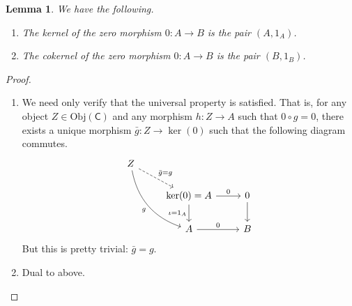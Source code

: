 \documentclass[a4paper,10pt]{scrreprt}
\newcommand{\Obj}{\mathrm{Obj}}
\theoremstyle{definition}
\theoremstyle{plain}
\newtheorem{lemma}{Lemma}[section]
\theoremstyle{remark}
\begin{document}
\begin{lemma}
  We have the following.
  \begin{enumerate}
    \item The kernel of the zero morphism $0: A \to B$ is the pair $(A, 1_{A})$.
    \item The cokernel of the zero morphism $0: A \to B$ is the pair $(B, 1_{B})$.
  \end{enumerate}
\end{lemma}
\begin{proof}
  $\,$
  \begin{enumerate}
    \item We need only verify that the universal property is satisfied. That is, for any object $Z \in \Obj(\mathsf{C})$ and any morphism $h\colon Z \to A$ such that $0 \circ g = 0$, there exists a unique morphism $\bar{g}\colon Z \to \ker(0)$ such that the following diagram commutes.
      \begin{equation*}
        \begin{tikzcd}
          Z
          \arrow[rdd, swap, bend right, "g"]
          \arrow[rd, dashed, "\bar{g}=g"]
          \\
          & \ker(0) = A
          \arrow[r, "0"]
          \arrow[d, swap, "\iota = 1_{A}"]
          & 0
          \arrow[d]
          \\
          & A
          \arrow[r, "0"]
          & B
        \end{tikzcd}
      \end{equation*}
      But this is pretty trivial: $\bar{g} = g$.

    \item Dual to above.
  \end{enumerate}
\end{proof}
\end{document}
